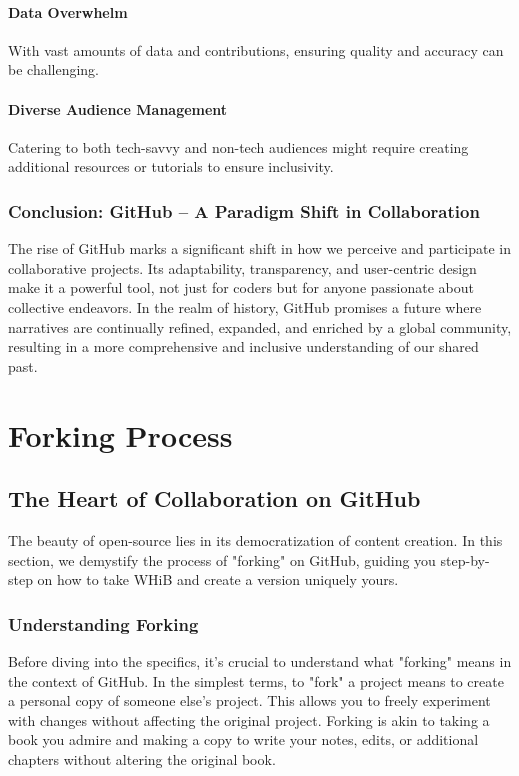 \documentclass[a4paper,12pt]{book}
\begin{document}
\subsubsection*{Data Overwhelm}
With vast amounts of data and contributions, ensuring quality and accuracy can be challenging.

\subsubsection*{Diverse Audience Management}
Catering to both tech-savvy and non-tech audiences might require creating additional resources or tutorials to ensure inclusivity.

\subsection*{Conclusion: GitHub – A Paradigm Shift in Collaboration}
The rise of GitHub marks a significant shift in how we perceive and participate in collaborative projects. Its adaptability, transparency, and user-centric design make it a powerful tool, not just for coders but for anyone passionate about collective endeavors. In the realm of history, GitHub promises a future where narratives are continually refined, expanded, and enriched by a global community, resulting in a more comprehensive and inclusive understanding of our shared past.

\chapter{Forking Process}
\section*{The Heart of Collaboration on GitHub}
The beauty of open-source lies in its democratization of content creation. In this section, we demystify the process of "forking" on GitHub, guiding you step-by-step on how to take WHiB and create a version uniquely yours.

\subsection*{Understanding Forking}
Before diving into the specifics, it's crucial to understand what "forking" means in the context of GitHub. In the simplest terms, to "fork" a project means to create a personal copy of someone else's project. This allows you to freely experiment with changes without affecting the original project. Forking is akin to taking a book you admire and making a copy to write your notes, edits, or additional chapters without altering the original book.
\end{document}
